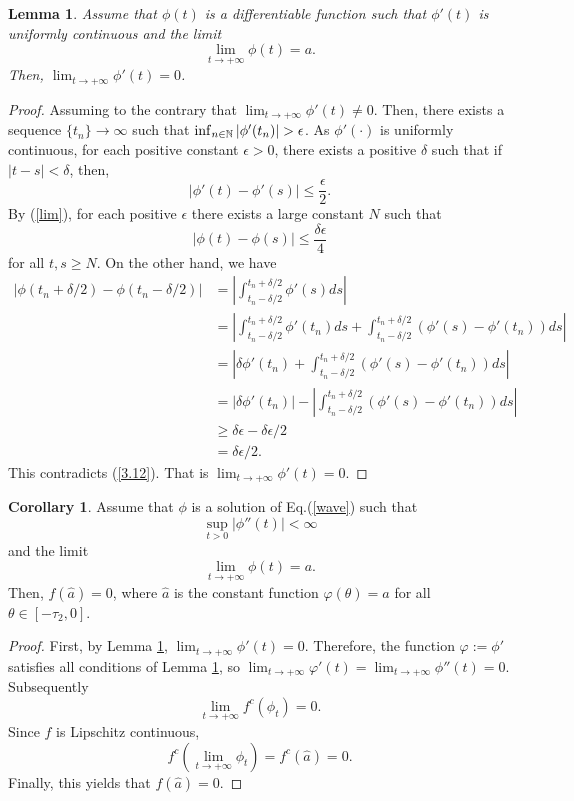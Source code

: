 \documentclass[12pt,letterpaper]{amsart}
\newtheorem{lemma}[theorem]{Lemma}
\theoremstyle{definition}
\newtheorem{corollary}[theorem]{Corollary}
\theoremstyle{remark}
\numberwithin{equation}{section}
\begin{document}
\begin{lemma}\label{lem 3.7}
Assume that $\phi(t)$ is a differentiable function such that $\phi'(t)$ is uniformly continuous
and the limit
\begin{equation}\label{lim}
\lim_{t\to+\infty} \phi(t) = a. 
\end{equation}
Then, $\lim_{t\to+\infty} \phi'(t)=0$.
\end{lemma}
\begin{proof}
Assuming to the contrary that $\lim_{t\to+\infty}\phi'(t)\not=0$. Then, there exists a sequence $\{t_n\}\to\infty$ such that $\inf_{n\in\mathbb N}|\phi'(t_n)| >\epsilon$.
As $\phi'(\cdot )$ is uniformly continuous, for each positive constant $\epsilon>0$, there exists a positive $\delta$ such that if $|t-s|<\delta$, then, 
\begin{equation}
|\phi'(t)-\phi'(s)| \le \frac{\epsilon}{2}.
\end{equation}
By (\ref{lim}), for each positive $\epsilon$ there exists a large constant $N$ such that 
\begin{equation}\label{3.12}
|\phi(t)-\phi(s)| \le \frac{\delta \epsilon}{4}
\end{equation}
for all $t,s\ge N$. 
On the other hand, we have
\begin{align*}
|\phi(t_n+\delta/2)-\phi(t_n-\delta/2) | &= |\int^{t_n+\delta/2}_{t_n-\delta/2} \phi'(s)ds | \\
& = |\int^{t_n+\delta/2}_{t_n-\delta/2} \phi'(t_n)ds + \int^{t_n+\delta/2}_{t_n-\delta/2} (\phi'(s)-\phi'(t_n))ds | \\
&=|\delta \phi'(t_n) +  \int^{t_n+\delta/2}_{t_n-\delta/2} (\phi'(s)-\phi'(t_n))ds | \\
&=|\delta \phi'(t_n) |-| \int^{t_n+\delta/2}_{t_n-\delta/2} (\phi'(s)-\phi'(t_n))ds | \\
&\ge \delta\epsilon - \delta \epsilon  /2                        \\
 & =\delta \epsilon  /2   .
\end{align*}
This contradicts (\ref{3.12}). That is $\lim_{t\to+\infty}\phi'(t)=0$.
\end{proof}
\begin{corollary}
Assume that $\phi$ is a solution of Eq.(\ref{wave}) such that
\begin{equation}
\sup_{t >0} |\phi''(t)| <\infty 
\end{equation}
and the limit
$$
\lim_{t\to+\infty} \phi(t) = a. 
$$
Then, $f(\hat a)=0$, where $\hat a$ is the constant function $\varphi(\theta)=a$ for all $\theta \in [-\tau_2,0]$.
\end{corollary}
\begin{proof}
First, by Lemma \ref{lem 3.7}, $\lim_{t\to+\infty} \phi'(t)=0$. Therefore, the function $\varphi:=\phi'$ satisfies all conditions of Lemma \ref{lem 3.7}, so
$\lim_{t\to+\infty} \varphi'(t)=\lim_{t\to+\infty} \phi''(t)=0$. Subsequently
$$
\lim_{t\to+\infty} f^c(\phi_t)=0.
$$
Since $f$ is Lipschitz continuous, 
$$
f^c( \lim_{t\to+\infty} \phi_t)=f^c(\hat a)=0.
$$
Finally, this yields that $f(\hat a)=0.$ 
\end{proof}
\end{document}
